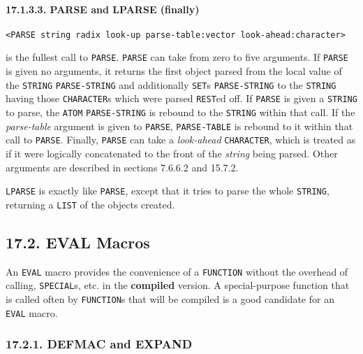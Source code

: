 \documentclass[a4paper,]{article}
\let\oldparagraph\paragraph
\renewcommand{\paragraph}[1]{\oldparagraph{#1}\mbox{}}
\begin{document}
\paragraph{17.1.3.3. PARSE and LPARSE (finally)}\label{parse-and-lparse-finally}

\begin{verbatim}
<PARSE string radix look-up parse-table:vector look-ahead:character>
\end{verbatim}

 is the fullest call to \texttt{PARSE}. \texttt{PARSE} can take from zero to five arguments.
If \texttt{PARSE} is given no arguments, it returns the first object parsed from the local value of the \texttt{STRING}
\texttt{PARSE-STRING} and additionally \texttt{SET}s \texttt{PARSE-STRING} to the
\texttt{STRING} having those \texttt{CHARACTER}s which were parsed \texttt{REST}ed off. If \texttt{PARSE} is given a
\texttt{STRING} to parse, the \texttt{ATOM} \texttt{PARSE-STRING} is rebound to the \texttt{STRING} within that call. If
the \emph{parse-table} argument is given to \texttt{PARSE}, \texttt{PARSE-TABLE} is rebound to it within that call to
\texttt{PARSE}. Finally, \texttt{PARSE} can take a \emph{look-ahead} \texttt{CHARACTER}, which is treated as if it were
logically concatenated to the front of the \emph{string} being parsed. Other arguments are described in sections 7.6.6.2
and 15.7.2.

\texttt{LPARSE} is exactly like \texttt{PARSE}, except that it tries to parse the whole
\texttt{STRING}, returning a \texttt{LIST} of the objects created.

\subsection{17.2. EVAL Macros}\label{eval-macros}

An \texttt{EVAL} macro provides the convenience of a \texttt{FUNCTION} without the overhead of calling,
\texttt{SPECIAL}s, etc. in the \textbf{compiled} version. A special-purpose function that is called
often by \texttt{FUNCTION}s that will be compiled is a good candidate for an \texttt{EVAL} macro.

\subsubsection{17.2.1. DEFMAC and EXPAND}\label{defmac-and-expand}
\end{document}
